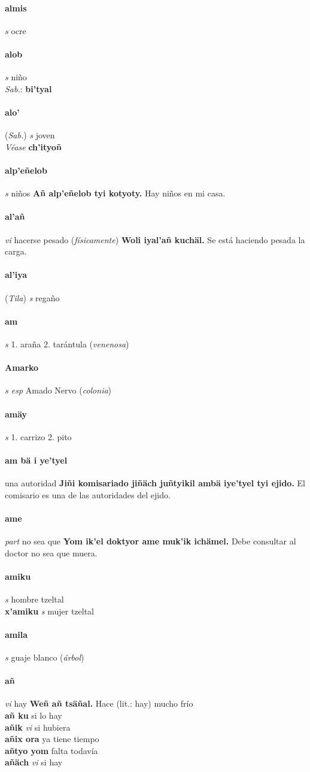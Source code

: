 \documentclass{scrbook}
\newcommand{\entry}[1]{\paragraph{#1}}
\newcommand{\onedefinition}[1]{#1.}
\newcommand{\partofspeech}[1]{\textit{#1}}
\newcommand{\spanishtranslation}[1]{#1}
\newcommand{\clarification}[1]{(\textit{#1})}
\newcommand{\cholexample}[1]{\textbf{#1}}
\newcommand{\exampletranslation}[1]{#1}
\newcommand{\dialectvariant}[1]{\\\textit{#1}:}
\newcommand{\dialectword}[1]{\textbf{#1}}
\newcommand{\alsosee}[1]{\\\textit{Véase} \textbf{#1}}
\newcommand{\relevantdialect}[1]{(\textit{#1})}
\newcommand{\secondaryentry}[1]{\\\textbf{#1}}
\newcommand{\secondpartofspeech}[1]{\textit{#1}}
\newcommand{\secondtranslation}[1]{#1}
\begin{document}
\begin{multicols}{2}
\entry{almis}
\partofspeech{s}
\spanishtranslation{ocre}

\entry{alob}
\partofspeech{s}
\spanishtranslation{niño}
\dialectvariant{Sab.}
\dialectword{bi'tyal}

\entry{alo'}
\relevantdialect{Sab.}
\partofspeech{s}
\spanishtranslation{joven}
\alsosee{ch'ityoñ}

\entry{alp'eñelob}
\partofspeech{s}
\spanishtranslation{niños}
\cholexample{Añ alp'eñelob tyi kotyoty.}
\exampletranslation{Hay niños en mi casa.}

\entry{al'añ}
\partofspeech{vi}
\spanishtranslation{hacerse pesado}
\clarification{físicamente}
\cholexample{Woli iyal'añ kuchäl.}
\exampletranslation{Se está haciendo pesada la carga.}

\entry{al'iya}
\relevantdialect{Tila}
\partofspeech{s}
\spanishtranslation{regaño}

\entry{am}
\partofspeech{s}
\onedefinition{1}
\spanishtranslation{araña}
\onedefinition{2}
\spanishtranslation{tarántula}
\clarification{venenosa}

\entry{Amarko}
\partofspeech{s esp}
\spanishtranslation{Amado Nervo}
\clarification{colonia}

\entry{amäy}
\partofspeech{s}
\onedefinition{1}
\spanishtranslation{carrizo}
\onedefinition{2}
\spanishtranslation{pito}

\entry{am bä i ye'tyel}
\spanishtranslation{una autoridad}
\cholexample{Jiñi komisariado jiñäch juñtyikil ambä iye'tyel tyi ejido.}
\exampletranslation{El comisario es una de las autoridades del ejido.}

\entry{ame}
\partofspeech{part}
\spanishtranslation{no sea que}
\cholexample{Yom ik'el doktyor ame muk'ik ichämel.}
\exampletranslation{Debe consultar al doctor no sea que muera.}

\entry{amiku}
\partofspeech{s}
\spanishtranslation{hombre tzeltal}
\secondaryentry{x'amiku}
\secondpartofspeech{s}
\secondtranslation{mujer tzeltal}

\entry{amila}
\partofspeech{s}
\spanishtranslation{guaje blanco}
\clarification{árbol}

\entry{añ}
\partofspeech{vi}
\spanishtranslation{hay}
\cholexample{Weñ añ tsäñal.}
\exampletranslation{Hace (lit.: hay) mucho frío}
\secondaryentry{añ ku}
\secondtranslation{si lo hay}
\secondaryentry{añik}
\secondpartofspeech{vi}
\secondtranslation{si hubiera}
\secondaryentry{añix ora}
\secondtranslation{ya tiene tiempo}
\secondaryentry{añtyo yom}
\secondtranslation{falta todavía}
\secondaryentry{añäch}
\secondpartofspeech{vi}
\secondtranslation{si hay}


\end{multicols}
\end{document}
